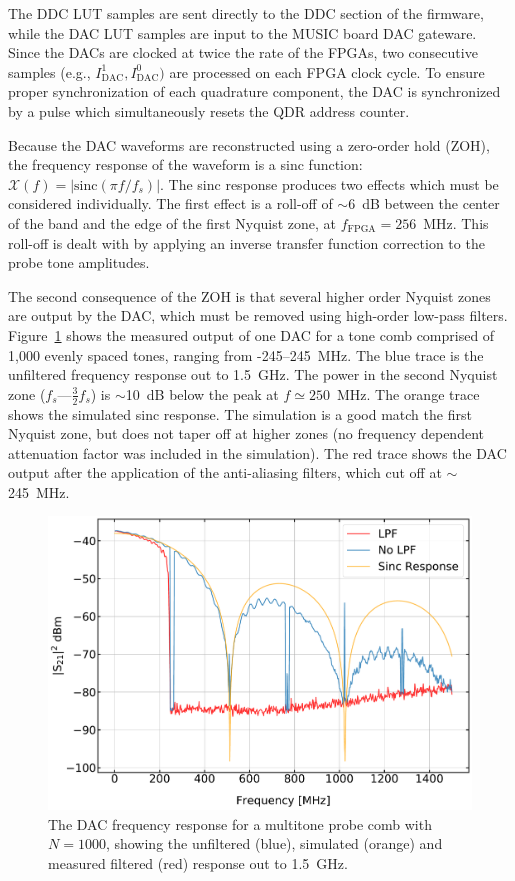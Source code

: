 The DDC LUT samples are sent directly to the DDC section of the firmware, while the DAC LUT samples are input to the MUSIC board DAC gateware. Since the DACs are clocked at twice the rate of the FPGAs, two consecutive samples (e.g., $I_{\mathrm{DAC}}^{1}, I_{\mathrm{DAC}}^{0})$ are processed on each FPGA clock cycle. To ensure proper synchronization of each quadrature component, the DAC is synchronized by a pulse which simultaneously resets the QDR address counter.

Because the DAC waveforms are reconstructed using a zero-order hold (ZOH), the frequency response of the waveform is a sinc function: $\mathcal{X}(f) = \left|{\mathrm{sinc}}(\pi f/f_{s}) \right|$. The sinc response produces two effects which must be considered individually. The first effect is a roll-off of $\sim$6~dB between the center of the band and the edge of the first Nyquist zone, at $f_{\mathrm{FPGA}} = 256$~MHz. This roll-off is dealt with by applying an inverse transfer function correction to the probe tone amplitudes.

The second consequence of the ZOH is that several higher order Nyquist zones are output by the DAC, which must be removed using high-order low-pass filters. Figure~\ref{fig:dac sim} shows the measured output of one DAC for a tone comb comprised of 1,000 evenly spaced tones, ranging from -245--245~MHz. The blue trace is the unfiltered frequency response out to 1.5~GHz. The power in the second Nyquist zone ($f_{s}$---$\frac{3}{2}f_{s}$) is $\sim$10~dB below the peak at $f \simeq 250$~MHz. The orange trace shows the simulated sinc response. The simulation is a good match the first Nyquist zone, but does not taper off at higher zones (no frequency dependent attenuation factor was included in the simulation). The red trace shows the DAC output after the application of the anti-aliasing filters, which cut off at $\sim$245~MHz.

\begin{figure}[!htbp]
\centering
\includegraphics[width=\textwidth]{figures/readout/sim/dac_comp}
\caption[~The DAC frequency response (measured and simulated), with and without anti-aliasing filters.]{The DAC frequency response for a multitone probe comb with $N = 1000$, showing the unfiltered (blue), simulated (orange) and measured filtered (red) response out to 1.5~GHz.}
\label{fig:dac sim}
\end{figure}

